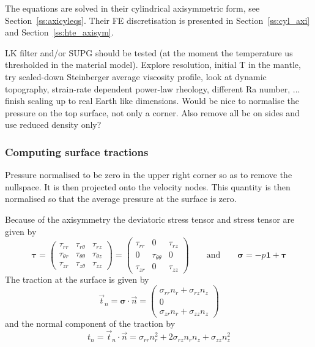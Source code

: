 The equations are solved in their cylindrical axisymmetric form, see
Section~\ref{ss:axicyleqs}. Their FE discretisation is presented in Section~\ref{ss:cyl_axi}
and Section~\ref{ss:hte_axisym}.


\begin{remark}
LK filter and/or SUPG should be tested (at the moment the temperature us thresholded in the 
material model). Explore resolution, initial T in the mantle, try scaled-down Steinberger average 
viscosity profile, look at dynamic topography, strain-rate dependent power-law rheology, different 
Ra number, ... finish scaling up to real Earth like dimensions.
Would be nice to normalise the pressure on the top surface, not only a corner.
Also remove all bc on sides and use reduced density only? 
\end{remark}

\subsubsection*{Computing surface tractions}

Pressure normalised to be zero in the upper right corner so as to remove the nullspace. 
It is then projected onto the velocity nodes. This quantity is then normalised so that 
the average pressure at the surface is zero. 

Because of the axisymmetry the deviatoric stress tensor and stress tensor 
are given by
\[
{\bm \tau} 
= 
\left(
\begin{array}{ccc}
\tau_{rr} & \tau_{r\theta} & \tau_{rz} \\
\tau_{\theta r} & \tau_{\theta \theta} & \tau_{\theta z} \\
\tau_{zr} & \tau_{z\theta} & \tau_{zz} 
\end{array}
\right)
=
\left(
\begin{array}{ccc}
\tau_{rr} & 0 & \tau_{rz} \\
0  & \tau_{\theta \theta} & 0 \\
\tau_{zr} & 0 & \tau_{zz} 
\end{array}
\right)
\qquad
\text{and}
\qquad
{\bm \sigma} = -p {\bm 1} + {\bm \tau}
\]
The traction at the surface is given by 
\[
\vec{t}_n 
= {\bm \sigma}\cdot \vec{n}
=
\left(
\begin{array}{c}
\sigma_{rr} n_r + \sigma_{rz} n_z \\
0 \\
\sigma_{zr} n_r + \sigma_{zz} n_z
\end{array}
\right)
\]
and the normal component of the traction by 
\[
t_n= \vec{t}_n \cdot \vec{n} = \sigma_{rr} n_r^2 + 2 \sigma_{rz} n_r n_z + \sigma_{zz} n_z^2
\]




